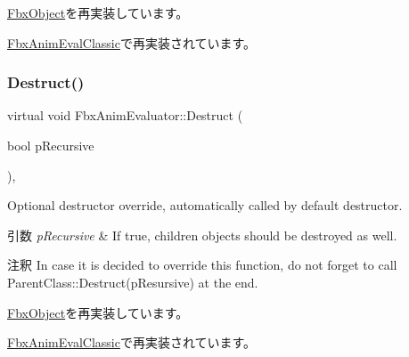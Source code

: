 \hyperlink{class_fbx_object_a313503bc645af3fdceb4a99ef5cea7eb}{Fbx\+Object}を再実装しています。



\hyperlink{class_fbx_anim_eval_classic_a9b0ca916c170485271aa2ba23d38019a}{Fbx\+Anim\+Eval\+Classic}で再実装されています。

\mbox{\label{class_fbx_anim_evaluator_ac425dd202ceb6c0e5adfc86d8c901dd0}} 
\subsubsection{\texorpdfstring{Destruct()}{Destruct()}}
{\footnotesize\ttfamily virtual void Fbx\+Anim\+Evaluator\+::\+Destruct (\begin{DoxyParamCaption}\item[{bool}]{p\+Recursive }\end{DoxyParamCaption})\hspace{0.3cm}{\ttfamily [protected]}, {\ttfamily [virtual]}}

Optional destructor override, automatically called by default destructor. 
\begin{DoxyParams}{引数}
{\em p\+Recursive} & If true, children objects should be destroyed as well. \\
\hline
\end{DoxyParams}
\begin{DoxyRemark}{注釈}
In case it is decided to override this function, do not forget to call Parent\+Class\+::\+Destruct(p\+Resursive) at the end. 
\end{DoxyRemark}


\hyperlink{class_fbx_object_a123e084d9b32b29c28af6384b7c3c608}{Fbx\+Object}を再実装しています。



\hyperlink{class_fbx_anim_eval_classic_a308a42f3bd439a3e36f3b5171d5fc092}{Fbx\+Anim\+Eval\+Classic}で再実装されています。

\mbox{\label{class_fbx_anim_evaluator_a6de6ef5ab77169192cd39baf76f14037}} 
